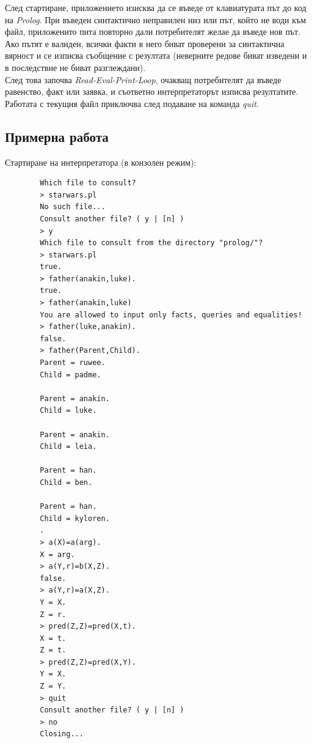 \documentclass[15pt]{extarticle}
\begin{document}
	След стартиране, приложението изисква да се въведе от клавиатурата път до код на \emph{Prolog}. При въведен синтактично неправилен низ или път, който не води към файл, приложенито пита повторно дали потребителят желае да въведе нов път. Ако пътят е валиден, всички факти в него биват проверени за синтактична вярност и се изписва съобщение с резултата (неверните редове биват изведени и в последствие не биват разглеждани).\\
	След това започва \emph{Read-Eval-Print-Loop}, очакващ потребителят да въведе равенство, факт или заявка, и съответно интерпретаторът изписва резултатите.\\
	Работата с текущия файл приключва след подаване на команда \emph{quit}.
	
	\subsection{Примерна работа}
	
	Стартиране на интерпретатора (в конзолен режим):
	
	\begin{lstlisting}
		Which file to consult?
		> starwars.pl
		No such file...
		Consult another file? ( y | [n] )
		> y
		Which file to consult from the directory "prolog/"?
		> starwars.pl
		true.
		> father(anakin,luke).
		true.
		> father(anakin,luke)
		You are allowed to input only facts, queries and equalities!
		> father(luke,anakin).
		false.
		> father(Parent,Child).
		Parent = ruwee.
		Child = padme.
		
		Parent = anakin.
		Child = luke.
		
		Parent = anakin.
		Child = leia.
		
		Parent = han.
		Child = ben.
		
		Parent = han.
		Child = kyloren.
		.
		> a(X)=a(arg).
		X = arg.
		> a(Y,r)=b(X,Z).
		false.
		> a(Y,r)=a(X,Z).
		Y = X.
		Z = r.
		> pred(Z,Z)=pred(X,t).
		X = t.
		Z = t.
		> pred(Z,Z)=pred(X,Y).
		Y = X.
		Z = Y.
		> quit
		Consult another file? ( y | [n] )
		> no
		Closing...
		
	\end{lstlisting}
	
	
\end{document}

